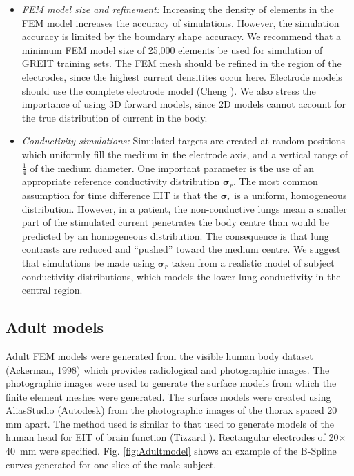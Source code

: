 \documentclass[12pt]{iopart}
\newcommand{\sG}{\mbox{${\boldsymbol \sigma}$}}
\begin{document}
\begin{itemize}
\item 
{\em FEM model size and refinement:}
Increasing the density of elements in the FEM
model increases the accuracy of simulations. However,
the simulation accuracy is limited by the boundary
shape accuracy.
We recommend that a minimum FEM model size of 25,000
elements be used for simulation of
GREIT training sets.
The FEM mesh should be refined in the region of
the electrodes, since the highest current densitites
occur here. Electrode models should use the
complete electrode model (Cheng ).
We also stress the importance of using 3D 
forward models, since 2D models
 cannot account for the true
distribution of current in the body.

\item
{\em Conductivity simulations:}
Simulated targets are created at random positions
which uniformly fill the medium in the electrode axis, and
a vertical range of $\frac{1}{4}$ of the medium
diameter.  One important parameter is the use of
an appropriate reference conductivity distribution
$\sG_r$. The most common assumption for time 
difference EIT is that the $\sG_r$ is a uniform,
homogeneous distribution. However, in a patient,
the non-conductive lungs mean
a smaller part of the stimulated current penetrates
the body centre than would be predicted by an
homogeneous distribution. The consequence is that
lung contrasts are reduced and ``pushed'' toward
the medium centre.  We suggest that 
simulations be made using $\sG_r$ taken from a
realistic model of subject conductivity distributions,
which models the lower lung conductivity in 
the central region.

\end{itemize}



\subsection{Adult models}

Adult FEM models were generated from the visible human body dataset
(Ackerman, 1998) which provides radiological and photographic
images.  The photographic images were used to generate the surface models
from which the finite element meshes were generated.  The surface models
were created using AliasStudio (Autodesk) from the
photographic images of the thorax spaced $20~$mm apart. The method used
is similar to that used to generate models of the human head for EIT of
brain function (Tizzard ). 
Rectangular electrodes of 20$\times$40~mm were specified.
Fig. \ref{fig:Adultmodel} shows an example of the
B-Spline curves generated for one slice of the male subject.
\end{document}
